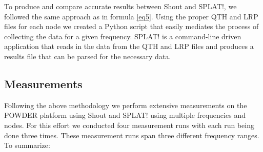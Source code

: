 To produce and compare accurate results between Shout and SPLAT!, we followed the same approach as in formula \eqref{eq5}. Using the 
proper QTH and LRP files for each node we created a Python script that easily mediates the process of collecting the data
for a given frequency. SPLAT! is a command-line driven application that reads in the data from the QTH and LRP files and produces a 
results file that can be parsed for the necessary data. 


\subsection{Measurements}
Following the above methodology we perform extensive measurements on the POWDER platform using Shout and SPLAT! using
multiple frequencies and nodes. For this effort we conducted four measurement runs with each run being done three times. These measurement runs span three different frequency ranges. To summarize: 
